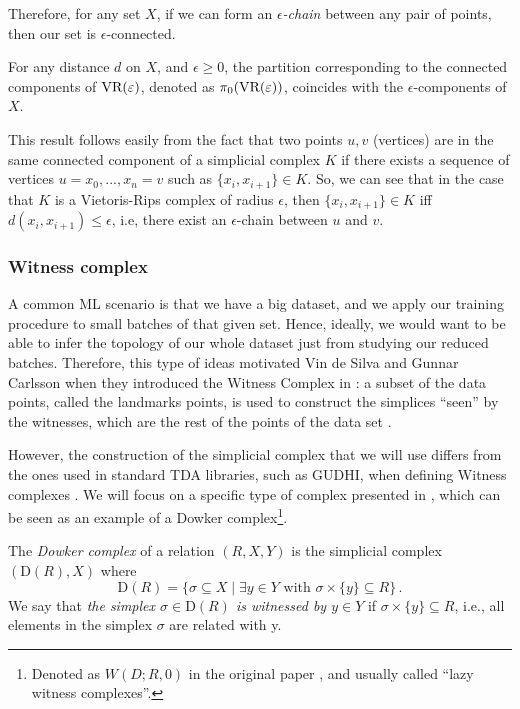 \documentclass[../main.tex]{subfiles}
\begin{document}
Therefore, for any set $X$, if we can form an \emph{$\epsilon$-chain} between any pair of points, then our set is $\epsilon$-connected. 

\begin{proposition}
\label{prop:connected}
For any distance $d$ on $X$, and $\epsilon \geq 0$, the partition corresponding to the connected components of $\text{\rm VR}(\epsilon)$, denoted as $\pi_0(\text{\rm VR}(\epsilon))$, coincides with the $\epsilon$-components of $X$.
\end{proposition}

This result follows easily from the fact that two points $u,v$ (vertices) are in the same connected component of a simplicial complex $K$ if there exists a sequence of vertices $u=x_0,..., x_n=v$ such as $\{x_i, x_{i+1}\} \in K$. So, we can see that in the case that $K$ is a Vietoris-Rips complex of radius $\epsilon$, then $\{x_i, x_{i+1}\} \in K$ iff $d(x_i, x_{i+1})\leq\epsilon$, i.e, there exist an $\epsilon$-chain between $u$ and $v$. 

\subsubsection*{Witness complex}

A common ML scenario is that we have a big dataset, and we apply our training procedure to small batches of that given set. Hence, ideally, we would want to be able to infer the topology of our whole dataset just from studying our reduced batches. Therefore, this type of ideas motivated Vin de Silva and Gunnar Carlsson when they introduced the Witness Complex in \cite{silva_topological_2004}: a subset of the data points, called the landmarks points, is used to construct the simplices ``seen'' by the witnesses, which are the rest of the points of the data set \cite{medbouhi_towards_2022}.

However, the construction of the simplicial complex that we will use differs from the ones used in standard TDA libraries, such as GUDHI, when defining Witness complexes \cite{noauthor_gudhi_nodate}. We will focus on a specific type of complex presented in \cite{silva_topological_2004}, which can be seen as an example of a Dowker complex\footnote{Denoted as $W(D; R, 0)$ in the original paper \cite{silva_topological_2004}, and usually called ``lazy witness complexes''.}.

\begin{definition}
The \emph{Dowker complex} of a relation $(R, X, Y)$ is the simplicial complex $(\text{D}(R), X)$ where
\[
\text{D}(R) = \{\sigma \subseteq X \mid \exists y \in Y \text{ with } \sigma \times \{y\} \subseteq R\}\,.
\]
We say that \emph{the simplex $\sigma \in \text{D}(R)$ is witnessed by $y \in Y$} if $\sigma \times \{y\} \subseteq R$, i.e., all elements in the simplex $\sigma$ are related with y.
\end{definition}
\end{document}
